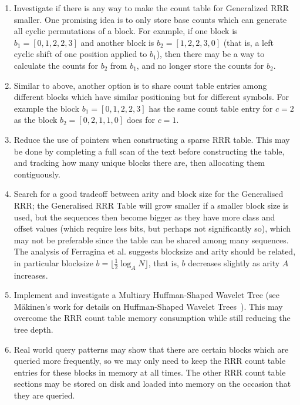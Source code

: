 \begin{enumerate}
\item
	Investigate if there is any way to make the count table for Generalized RRR 
	smaller. One promising idea is to only store base counts which can
	generate all cyclic permutations of a block. For example, if one block is
	$b_1 = [0, 1, 2, 2, 3]$ and another block is $b_2 = [1, 2, 2, 3, 0]$ (that 
	is, a left cyclic shift of one position applied to $b_1$), then there may be
	a way to calculate the counts for $b_2$ from $b_1$, and no longer store the
	counts for $b_2$.
	
\item
	Similar to above, another option is to share count table entries among 
	different blocks which have similar positioning but for different symbols. 
	For example the block $b_1 = [0, 1, 2, 2, 3]$ has the same count table entry 
	for $c = 2$ as the block $b_2 = [0, 2, 1, 1, 0]$ does for $c = 1$.
	
\item
	Reduce the use of pointers when constructing a sparse RRR table. This may be
	done by completing a full scan of the text before constructing the table,
	and tracking how many unique blocks there are, then allocating them 
	contiguously.

\item
 	Search for a good tradeoff between arity and block size for the
	Generalised RRR; the Generalised RRR Table will grow smaller if a smaller 
	block size is used, but the sequences then become bigger as they have more
	class and offset values (which require less bits, but perhaps not 
	significantly so), which may not be preferable since the table can be shared 
	among many sequences. The analysis of Ferragina et al. \cite{ferragina2007}
	suggests blocksize and arity should be related, in particular blocksize
	$b = \lfloor \frac{1}{2} \log_{A} N \rfloor$, that is, $b$ decreases 
	slightly as arity $A$ increases.

\item
	Implement and investigate a Multiary Huffman-Shaped Wavelet Tree (see 
	M\"{a}kinen's work for details on Huffman-Shaped Wavelet
	Trees~\cite{makinen2005}). This may
	overcome the RRR count table memory consumption while still reducing the 
	tree depth.

\item
	Real world query patterns may show that there are certain blocks which are 
	queried more frequently, so we may only need to keep the RRR count table 
	entries
	for these blocks in memory at all times. The other RRR count table sections 
	may be stored on disk and loaded into memory on the occasion that they are 
	queried.


\end{enumerate}
